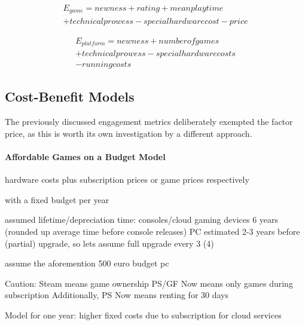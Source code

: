 
\begin{equation}
\begin{split}
E_{game} = {newness} + {rating} +  {meanplaytime} \\+ {technicalprowess} - {specialhardwarecost} - {price}
\end{split}
\end{equation}

\begin{equation}
\begin{split}
E_{platform} = {newness} + {numberofgames} \\+ {technicalprowess} - {specialhardwarecosts}\\ - {runningcosts}
\end{split}
\end{equation}




\subsection{Cost-Benefit Models}

The previously discussed engagement metrics deliberately exempted the factor price, as this is worth its own investigation by a different approach.


\paragraph{Affordable Games on a Budget Model}

hardware costs plus subscription prices or game prices respectively

with a fixed budget per year

assumed lifetime/depreciation time:
consoles/cloud gaming devices $6$ years (rounded up average time before console releases)
PC estimated 2-3 years before (partial) upgrade, so lets assume full upgrade every 3 (4)

assume the aforemention 500 euro budget pc

Caution: 
Steam means game ownership
PS/GF Now means only games during subscription
Additionally, PS Now means renting for 30 days

Model for one year: higher fixed costs due to subscription for cloud services

